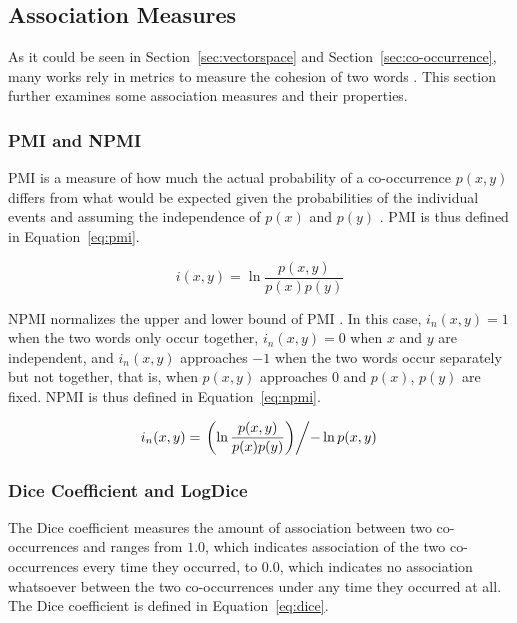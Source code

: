 \subsection{Association Measures}

As it could be seen in Section~\ref{sec:vectorspace} and
Section~\ref{sec:co-occurrence}, many works rely in metrics to measure the
cohesion of two words \cite{pantel2003clustering,pantel2002discovering,jurgens2010hermit,klapaftis2008word,korkontzelos2010uoy,correia2015syntax}.
This section further examines some association measures and their properties.

\subsubsection*{\acl*{PMI} and \acl*{NPMI}}

\ac{PMI} is a measure of how much the actual probability of a co-occurrence
$p(x,y)$ differs from what would be expected given the probabilities of the
individual events and assuming the independence of $p(x)$ and $p(y)$
\cite{bouma2009normalized}. \ac{PMI} is thus defined in Equation~\ref{eq:pmi}.

\begin{equation}
  \label{eq:pmi}
  i(x,y) = \ln \frac{p(x,y)}{p(x)p(y)}
\end{equation}

\ac{NPMI} normalizes the upper and lower bound of \ac{PMI} \cite{bouma2009normalized}.
In this case, $i_n(x,y) = 1$ when the two words only occur together,
$i_n(x,y) = 0$ when $x$ and $y$ are independent, and $i_n(x,y)$ approaches $-1$
when the two words occur separately but not together, that is, when $p(x,y)$
approaches 0 and $p(x)$, $p(y)$ are fixed. \ac{NPMI} is thus defined in
Equation~\ref{eq:npmi}.

\begin{equation}
  \label{eq:npmi}
  i_n(x,y) = \left. \left( \ln \frac{p(x,y)}{p(x)p(y)} \right) \middle/
             - \ln p(x,y) \right.
\end{equation}

\subsubsection*{Dice Coefficient and LogDice}

The Dice coefficient measures the amount of association between two
co-occurrences \cite{dice1945measures} and ranges from $1.0$, which indicates
association of the two co-occurrences every time they occurred, to $0.0$, which
indicates no association whatsoever between the two co-occurrences under any
time they occurred at all. The Dice coefficient is defined in
Equation~\ref{eq:dice}.

